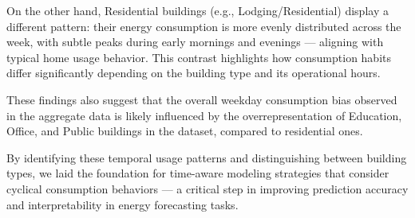 On the other hand, Residential buildings (e.g., Lodging/Residential) display a different pattern: their energy consumption is more evenly distributed across the week, with subtle peaks during early mornings and evenings — aligning with typical home usage behavior. This contrast highlights how consumption habits differ significantly depending on the building type and its operational hours.

These findings also suggest that the overall weekday consumption bias observed in the aggregate data is likely influenced by the overrepresentation of Education, Office, and Public buildings in the dataset, compared to residential ones.

By identifying these temporal usage patterns and distinguishing between building types, we laid the foundation for time-aware modeling strategies that consider cyclical consumption behaviors — a critical step in improving prediction accuracy and interpretability in energy forecasting tasks.